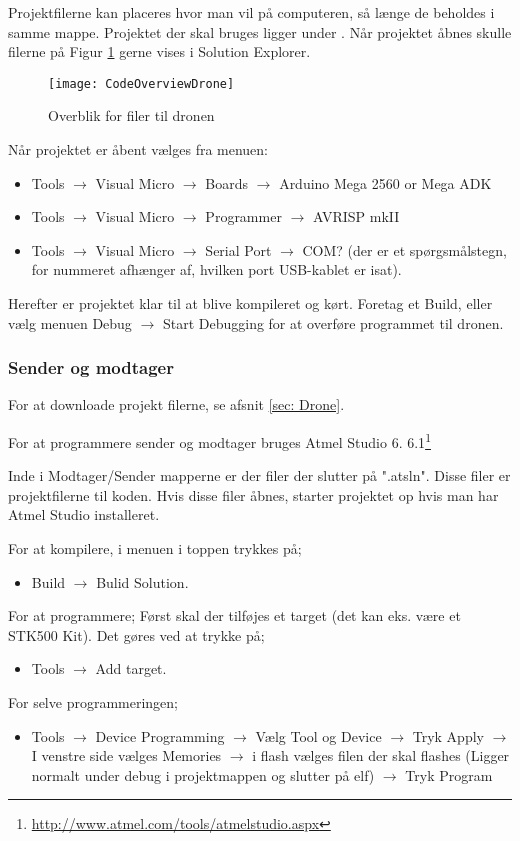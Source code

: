 \documentclass[Main]{subfiles}
\begin{document}
Projektfilerne kan placeres hvor man vil på computeren, så længe de beholdes i samme mappe.
Projektet der skal bruges ligger under .
Når projektet åbnes skulle filerne på Figur \ref{Fig:CodeOverviewDrone} gerne vises i Solution Explorer.

\begin{figure}[H]
\centering
\texttt{[image: CodeOverviewDrone]}
\caption{Overblik for filer til dronen}
\label{Fig:CodeOverviewDrone}
\end{figure}


Når projektet er åbent vælges fra menuen:
\begin{itemize}
\item Tools $\rightarrow$ Visual Micro $\rightarrow$ Boards $\rightarrow$ Arduino Mega 2560 or Mega ADK
\item Tools $\rightarrow$ Visual Micro $\rightarrow$ Programmer $\rightarrow$ AVRISP mkII
\item Tools $\rightarrow$ Visual Micro $\rightarrow$ Serial Port $\rightarrow$ COM? (der er et spørgsmålstegn, for nummeret afhænger af, hvilken port USB-kablet er isat).
\end{itemize}

Herefter er projektet klar til at blive kompileret og kørt.
Foretag et Build, eller vælg menuen Debug $\rightarrow$ Start Debugging for at overføre programmet til dronen.


\subsubsection{Sender og modtager}
For at downloade projekt filerne, se afsnit \ref{sec: Drone}.

For at programmere sender og modtager bruges Atmel Studio 6. 6.1\footnote{\url{http://www.atmel.com/tools/atmelstudio.aspx}} 

Inde i Modtager/Sender mapperne er der filer der slutter på ".atsln". Disse filer er projektfilerne til koden. Hvis disse filer åbnes, starter projektet op hvis man har Atmel Studio installeret.

For at kompilere, i menuen i toppen trykkes på;
\begin{itemize}
\item Build $\rightarrow$ Bulid Solution.
\end{itemize}

For at programmere;
Først skal der tilføjes et target (det kan eks. være et STK500 Kit). Det gøres ved at trykke på;
\begin{itemize}
\item Tools $\rightarrow$ Add target.
\end{itemize}
For selve programmeringen;
\begin{itemize}
\item Tools $\rightarrow$ Device Programming $\rightarrow$ Vælg Tool og Device $\rightarrow$ Tryk Apply $\rightarrow$ I venstre side vælges Memories $\rightarrow$ i flash vælges filen der skal flashes (Ligger normalt under debug i projektmappen og slutter på elf) $\rightarrow$ Tryk Program
\end{itemize}
\end{document}
